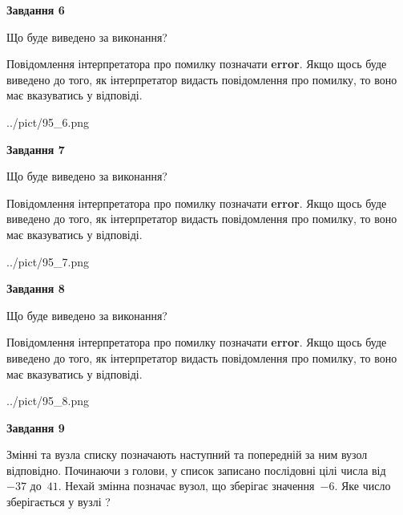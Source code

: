 \documentclass[12pt, ukrainian]{article}
\begin{document}
{\begin {large}
{\begin {center}\textbf{Завдання 6}\end {center}}\par
Що буде виведено за виконання?

Повідомлення інтерпретатора про помилку позначати \textbf{error}.
Якщо щось буде виведено до того, як інтерпретатор видасть повідомлення про помилку, 
то воно має вказуватись у відповіді. \par


\begin{center}
	{../pict/95_6.png}
\end{center}
\newpage

{\begin {center}\textbf{Завдання 7}\end {center}}\par
Що буде виведено за виконання?

Повідомлення інтерпретатора про помилку позначати \textbf{error}.
Якщо щось буде виведено до того, як інтерпретатор видасть повідомлення про помилку, 
то воно має вказуватись у відповіді. \par


\begin{center}
	{../pict/95_7.png}
\end{center}
\newpage

{\begin {center}\textbf{Завдання 8}\end {center}}\par
Що буде виведено за виконання?

Повідомлення інтерпретатора про помилку позначати \textbf{error}.
Якщо щось буде виведено до того, як інтерпретатор видасть повідомлення про помилку, 
то воно має вказуватись у відповіді. \par


\begin{center}
	{../pict/95_8.png}
\end{center}
\newpage

{\begin {center}\textbf{Завдання 9}\end {center}}\par
Змінні  та  вузла списку позначають наступний та попередній за ним вузол відповідно. Починаючи з голови, у список записано послідовні цілі числа від~$-37$ до~$41$. Нехай змінна  позначає вузол, що зберігає значення~$-6$.
Яке число зберігається у вузлі  ?\par
\newpage


\end{large}}
\end{document}
